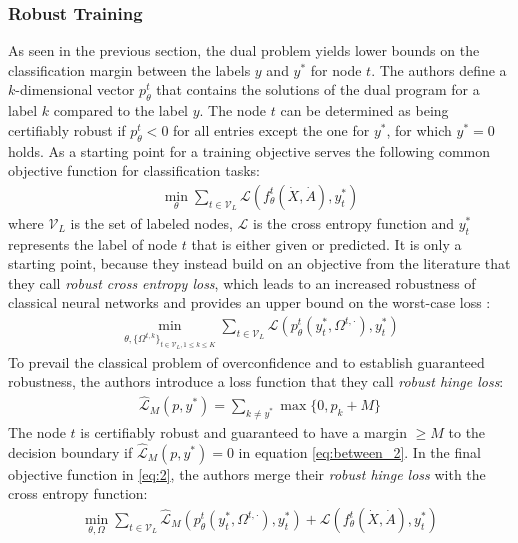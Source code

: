 \documentclass[a4paper,preprint]{sig-alternate}
\begin{document}
\subsubsection{Robust Training}
\label{subsec:robust_training}

As seen in the previous section, the dual problem yields lower bounds on the classification margin
between the labels $y$ and $y^{\ast}$ for node $t$.
The authors define a $k$-dimensional vector $p_{\theta}^t$ that contains the solutions of the dual program
for a label $k$ compared to the label $y$. The node $t$ can be determined as being certifiably robust if $p_{\theta}^t < 0$
for all entries except the one for $y^{\ast}$, for which $y^{\ast} = 0$ holds. \cite{Zuegner_2019}
As a starting point for a training objective serves the following common objective function for classification tasks:
\begin{gather}
    \min_{\theta} \sum_{t \in \mathcal{V}_L} \mathcal{L} (f_{\theta}^t (\dot{X}, \dot{A}), y_t^{\ast})
\end{gather}
where $\mathcal{V}_L$ is the set of labeled nodes, $\mathcal{L}$ is the cross entropy function and $y_t^{\ast}$ represents
the label of node $t$ that is either given or predicted.
It is only a starting point, because they instead build on an objective from the literature that they call \textit{robust cross entropy loss},
which leads to an increased robustness of classical neural networks and provides an upper bound on the worst-case loss \cite{Zuegner_2019}:
\begin{gather}
\label{eq:between}
    \min_{\theta, \{\Omega^{t, k}\}_{t \in \mathcal{V}_L, 1 \leq k \leq K}} \sum_{t \in \mathcal{V}_L} \mathcal{L} (p_{\theta}^t (y_t^{\ast}, \Omega^{t, \cdot}), y_t^{\ast})
\end{gather}
To prevail the classical problem of overconfidence and to establish guaranteed robustness, the authors introduce 
a loss function that they call \textit{robust hinge loss}:
\begin{gather}
\label{eq:between_2}
    \mathcal{\hat{L}}_M (p, y^{\ast}) = \sum_{k \neq y^{\ast}} \max \{0, p_k + M\}
\end{gather}
The node $t$ is certifiably robust and guaranteed to have a margin $\geq M$ to the decision boundary if $\mathcal{\hat{L}}_M (p, y^{\ast}) = 0$
in equation \ref{eq:between_2}. \cite{Zuegner_2019}
In the final objective function in \ref{eq:2}, the authors merge their \textit{robust hinge loss} with the cross entropy function:
\begin{gather}
\label{eq:2}
    \min_{\theta, \Omega} \sum_{t \in \mathcal{V}_L} \mathcal{\hat{L}}_M (p_{\theta}^t (y_t^{\ast}, \Omega^{t, \cdot}), y_t^{\ast}) + \mathcal{L} (f_{\theta}^t (\dot{X}, \dot{A}), y_t^{\ast})
\end{gather}
\end{document}
